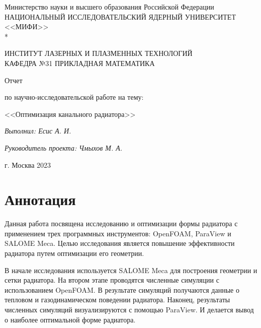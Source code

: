 \documentclass[a4paper,12pt]{article}
\theoremstyle{plain} %
\theoremstyle{definition} %
\theoremstyle{remark} %
\begin{document}
\renewcommand{\contentsname}{\Large Содержание}
\renewcommand{\bibname}{\normalfont\Large\bfseries Список литературы}

\begin{titlepage}
	\begin{center}
		Министерство науки и высшего образования Российской Федерации \\
		НАЦИОНАЛЬНЫЙ ИССЛЕДОВАТЕЛЬСКИЙ ЯДЕРНЫЙ УНИВЕРСИТЕТ <<МИФИ>> \\*
		\hrulefill
	\end{center}
	
	\begin{center}
		ИНСТИТУТ ЛАЗЕРНЫХ И ПЛАЗМЕННЫХ ТЕХНОЛОГИЙ\\
		КАФЕДРА №31 ПРИКЛАДНАЯ МАТЕМАТИКА
	\end{center}
	\vspace{1cm}
	
	\vspace{2em}
	
	\begin{center}
		\large{Отчет}
		
		по научно-исследовательской работе на тему:
	\end{center}
	\begin{center}
		\large <<Оптимизация канального радиатора>>
	\end{center}
	\begin{center}
		\large \textit{Выполнил: Есис А. И.}
		
		\textit{Руководитель проекта: Чмыхов М. А.}
	\end{center}
	
	
	\vspace{22em}
	
	\begin{center}
		г. Москва 2023
	\end{center}
\end{titlepage}

\newpage
\section*{Аннотация}

Данная работа посвящена исследованию и оптимизации формы радиатора с применением трех программных инструментов: OpenFOAM, ParaView и SALOME Meca. Целью исследования является повышение эффективности радиатора путем оптимизации его геометрии.

В начале исследования используется SALOME Meca для построения геометрии и сетки радиатора. На втором этапе проводятся численные симуляции с использованием OpenFOAM. В результате симуляций получаются данные о тепловом и газодинамическом поведении радиатора. Наконец, результаты численных симуляций визуализируются с помощью ParaView. И делается вывод о наиболее оптимальной форме радиатора.
\end{document}
